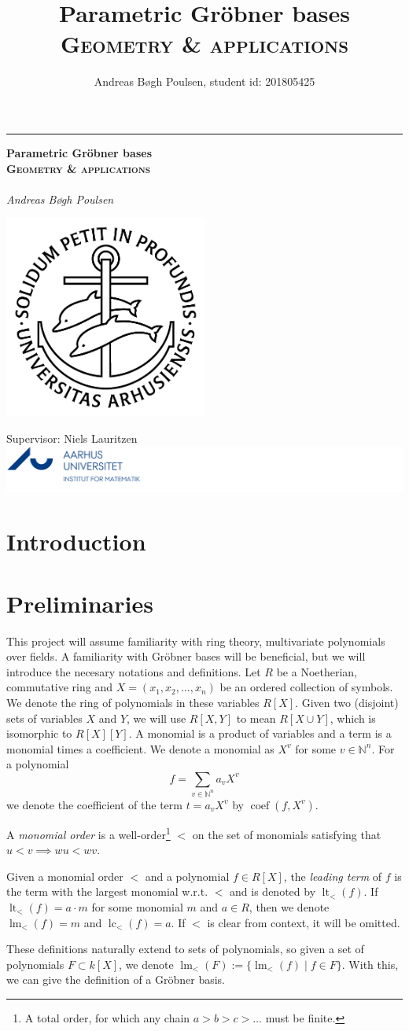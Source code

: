 \documentclass[a4paper, 12pt]{article}
\title{Parametric Gröbner bases\\{\large \textsc{Geometry \& applications}}}
\author{Andreas Bøgh Poulsen, student id: 201805425}
\newcommand{\N}{\mathbb{N}}
\DeclareMathOperator{\LT}{lt}
\DeclareMathOperator{\LM}{lm}
\DeclareMathOperator{\LC}{lc}
\DeclareMathOperator{\coef}{coef}
\theoremstyle{changedot}
\theoremstyle{changedotbreak}
\theoremstyle{nonumberplain}
\newcommand*{\titleGM}{%
\hspace*{0.2\textwidth} %
\rule{1pt}{\textheight} %
\hspace*{0.05\textwidth} %
\parbox[b]{0.75\textwidth}{ %
{\noindent\Huge\bfseries  Parametric Gröbner bases\\{\large \textsc{Geometry \& applications}}\\}\\[2\baselineskip] %
{\large \textit{Andreas Bøgh Poulsen \hfill \oldstylenums{201805425} }}\\%
{\large } %
\parbox[b][0pt]{0.5\textwidth}{
  \hspace{2cm}\includegraphics[width=0.5\textwidth]{ausegl_sort.png}
  \vspace{-10cm}
}

\vspace{0.5\textheight} %
\vfill
{\noindent Supervisor: Niels Lauritzen \hspace{2.5cm} \includegraphics{AU_logo.png}  }\\[\baselineskip] %
}%
}
\begin{document}
{}
\titleGM
\newpage
\tableofcontents

\newpage
{}

\section*{Introduction}


\section{Preliminaries}
This project will assume familiarity with ring theory, multivariate polynomials over fields. A familiarity with Gröbner bases will be beneficial, but we will introduce the necesary notations and definitions. Let $R$ be a Noetherian, commutative ring and $X = (x_{1}, x_{2}, \dots, x_{n})$ be an ordered collection of symbols. We denote the ring of polynomials in these variables $R[X]$. Given two (disjoint) sets of variables $X$ and $Y$, we will use $R[X, Y]$ to mean $R[X \cup Y]$, which is isomorphic to $R[X][Y]$. A monomial is a product of variables and a term is a monomial times a coefficient. We denote a monomial as $X^{v}$ for some $v \in \N^{n}$. For a polynomial \[f = \sum_{v \in \N^{n}} a_{v}X^{v}\] we denote the coefficient of the term $t = a_{v}X^{v}$ by $\coef(f, X^{v})$.

\begin{definition}
  A \textit{monomial order} is a well-order\footnote{A total order, for which any chain $a > b > c > \dots$ must be finite.} $<$ on the set of monomials satisfying that $u < v \implies wu < wv$.

  Given a monomial order $<$ and a polynomial $f \in R[X]$, the \textit{leading term} of $f$ is the term with the largest monomial w.r.t. $<$ and is denoted by $\LT_{<}(f)$. If $\LT_{<}(f) = a\cdot m$ for some monomial $m$ and $a \in R$, then we denote $\LM_{<}(f) = m$ and $\LC_{<}(f) = a$. If $<$ is clear from context, it will be omitted.
\end{definition}

These definitions naturally extend to sets of polynomials, so given a set of polynomials $F \subset k[X]$, we denote $\LM_{<}(F) := \{\LM_{<}(f) \mid f \in F\}$. With this, we can give the definition of a Gröbner basis.
\end{document}
